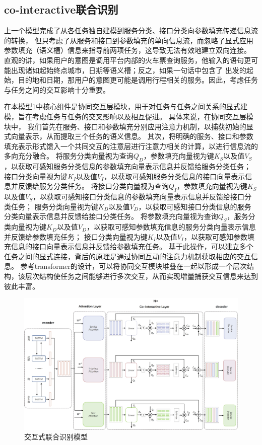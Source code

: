 \subsection{co-interactive联合识别}
上一个模型完成了从各任务独自建模到服务分类、接口分类向参数填充传递信息流的转换，
但只考虑了从服务和接口到参数填充的单向信息流，而忽略了显式应用参数填充（语义槽）信息来指导前两项任务，这导致无法有效地建立双向连接。
直观的讲，如果用户的意图是调用平台内部的火车票查询服务，他输入的语句更可能出现诸如起始终点城市，日期等语义槽；反之，如果一句话中包含了
出发的起始，目的地和日期，那用户的意图更可能是调用行程相关的服务。因此，考虑任务与任务之间的交互影响十分重要。

在本模型\ref{fig:lianhe2}中核心组件是协同交互层模块，用于对任务与任务之间关系的显式建模，旨在考虑任务与任务的交叉影响以及相互促进。
具体来说，在协同交互层模块中，
我们首先在服务、接口和参数填充分别应用注意力机制，以捕获初始的显式向量表示，从而提取三个任务的语义信息。
其次，将明确的服务、接口和参数填充表示形式馈入一个共同交互的注意层进行注意力相关的计算，以进行信息流的多向充分融合。
将服务分类向量视为查询$Q_D$，参数填充向量视为键$K_S$以及值$V_S$，以获取可感知服务分类信息的参数填充向量表示信息并反馈给服务分类任务；
接口分类向量视为键$K_I$以及值$V_I$，以获取可感知服务分类信息的接口向量表示信息并反馈给服务分类任务。
将接口分类向量视为查询$Q_I$，参数填充向量视为键$K_S$以及值$V_S$，以获取可感知接口分类信息的参数填充向量表示信息并反馈给接口分类任务；
服务分类向量视为键$K_D$以及值$V_D$，以获取可感知接口分类信息的服务分类向量表示信息并反馈给接口分类任务。
将参数填充向量视为查询$Q_S$，服务分类向量视为键$K_D$以及值$V_D$，以获取可感知参数填充信息的服务分类向量表示信息并反馈给参数填充任务；
接口分类向量视为键$K_I$以及值$V_I$，以获取可感知参数填充信息的接口向量表示信息并反馈给参数填充任务。
基于此操作，可以建立多个任务之间的显式连接，背后的原理是通过协同互动的注意力机制获取相应的交互信息。
参考transformer的设计，可以将协同交互模块堆叠在一起以形成一个层次结构，该层次结构使任务之间能够进行多次交互，从而实现增量捕获交互信息来达到彼此丰富。

\begin{figure}[htbp]
  \centering
  \includegraphics[width=16cm]{./images/co-interactive.jpg}
  \caption{交互式联合识别模型}
  \label{fig:lianhe2}
\end{figure}


